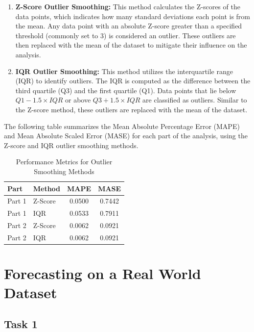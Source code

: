 \documentclass[12pt]{article}
\begin{document}
\begin{enumerate}
    \item \textbf{Z-Score Outlier Smoothing:} This method calculates the Z-scores of the data points, which indicates how many standard deviations each point is from the mean. Any data point with an absolute Z-score greater than a specified threshold (commonly set to 3) is considered an outlier. These outliers are then replaced with the mean of the dataset to mitigate their influence on the analysis.
    
    \item \textbf{IQR Outlier Smoothing:} This method utilizes the interquartile range (IQR) to identify outliers. The IQR is computed as the difference between the third quartile (Q3) and the first quartile (Q1). Data points that lie below \( Q1 - 1.5 \times IQR \) or above \( Q3 + 1.5 \times IQR \) are classified as outliers. Similar to the Z-score method, these outliers are replaced with the mean of the dataset.
\end{enumerate}

The following table summarizes the Mean Absolute Percentage Error (MAPE) and Mean Absolute Scaled Error (MASE) for each part of the analysis, using the Z-score and IQR outlier smoothing methods.

\begin{table}[h]
    \centering
    \caption{Performance Metrics for Outlier Smoothing Methods}
    \begin{tabular}{@{}llcc@{}}
        \toprule
        \textbf{Part} & \textbf{Method} & \textbf{MAPE} & \textbf{MASE} \\ \midrule
        Part 1 & Z-Score & 0.0500 & 0.7442 \\ 
        Part 1 & IQR     & 0.0533 & 0.7911 \\ 
        Part 2 & Z-Score & 0.0062 & 0.0921 \\ 
        Part 2 & IQR     & 0.0062 & 0.0921 \\ \bottomrule
    \end{tabular}
\end{table}



\section{Forecasting on a Real World Dataset
}
\subsection{Task 1}
\end{document}
